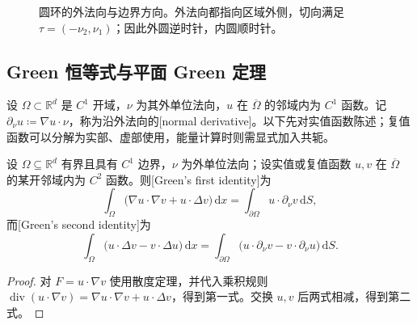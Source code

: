 \begin{figure}[htbp]
\centering
{}
\caption[圆环的外法向与边界方向]{圆环的外法向与边界方向。外法向都指向区域外侧，切向满足 \(\tau=(-\nu_2,\nu_1)\)；因此外圆逆时针，内圆顺时针。}
\label{b2:fig:01-vector-annulus}
\end{figure}

\subsection{Green 恒等式与平面 Green 定理}
\label{b2:subsec:010204}

设 \(\Omega\subset\mathbb R^d\) 是 \(C^1\) 开域，\(\nu\) 为其外单位法向，\(u\) 在 \(\overline\Omega\) 的邻域内为 \(C^1\) 函数。记 \(\partial_\nu u\coloneqq\nabla u\cdot\nu\)，称为沿外法向的[normal derivative]。以下先对实值函数陈述；复值函数可以分解为实部、虚部使用，能量计算时则需显式加入共轭。

\begin{corollary}\label{b2:cor:01-vector-green}
设 \(\Omega\subseteq\mathbb R^d\) 有界且具有 \(C^1\) 边界，\(\nu\) 为外单位法向；设实值或复值函数 \(u,v\) 在 \(\overline\Omega\) 的某开邻域内为 \(C^2\) 函数。则[Green's first identity]为
\begin{equation}\label{b2:eq:01-vector-green-first}
 \int_\Omega\bigl(\nabla u\cdot\nabla v+u\cdot\Delta v\bigr)\,\mathrm dx
 =\int_{\partial\Omega}u\cdot\partial_\nu v\,\mathrm dS,
\end{equation}
而[Green's second identity]为
\[
 \int_\Omega\bigl(u\cdot\Delta v-v\cdot\Delta u\bigr)\,\mathrm dx
 =\int_{\partial\Omega}
   \bigl(u\cdot\partial_\nu v-v\cdot\partial_\nu u\bigr)\,\mathrm dS.
\]
\end{corollary}
\begin{proof}
对 \(F=u\cdot\nabla v\) 使用散度定理，并代入乘积规则
\(\operatorname{div}(u\cdot\nabla v)=\nabla u\cdot\nabla v+u\cdot\Delta v\)，得到第一式。交换 \(u,v\) 后两式相减，得到第二式。
\end{proof}


